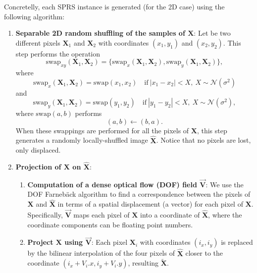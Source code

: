 \documentclass{article}
\begin{document}
Concretelly, each SPRS instance is generated (for the 2D case) using
the following algorithm:
\begin{enumerate}
\item \textbf{Separable 2D random shuffling of the samples of
    $\mathbf{X}$}: Let be two different pixels $\mathbf{X}_1$ and
  $\mathbf{X}_2$ with coordinates $(x_1, y_1)$ and $(x_2, y_2)$. This
  step performs the operation
  \begin{equation}
    \text{swap}_{xy}(\mathbf{X}_1,\mathbf{X}_2) = \{\text{swap}_x(\mathbf{X}_1,\mathbf{X}_2), \text{swap}_y(\mathbf{X}_1,\mathbf{X}_2)\},
  \end{equation}
  where
  \begin{equation}
    \text{swap}_x(\mathbf{X}_1,\mathbf{X}_2) = \text{swap}(x_1, x_2)\quad\text{if}~|x_1-x_2|<X,~X\sim\mathcal{N}(\sigma^2)
  \end{equation}
  and
  \begin{equation}
    \text{swap}_y(\mathbf{X}_1,\mathbf{X}_2) = \text{swap}(y_1, y_2)\quad\text{if}~|y_1-y_2|<X,~X\sim\mathcal{N}(\sigma^2),
  \end{equation}
  where $\text{swap}(a,b)$ performs
  \begin{equation}
    (a,b) \leftarrow (b,a).
  \end{equation}
  When these swappings are performed for all the pixels of
  $\mathbf{X}$, this step generates a randomly locally-shuffled image
  $\hat{\mathbf{X}}$. Notice that no pixels are lost, only displaced.

\item \textbf{Projection of $\mathbf{X}$ on $\hat{\mathbf{X}}$}:
  \begin{enumerate}
  \item \textbf{Computation of a dense optical flow (DOF) field
      $\overrightarrow{\mathbf{V}}$}: We use the DOF Farneb\"ack
    algorithm \cite{farneback2003two} to find a correspondence between
    the pixels of $\mathbf{X}$ and $\hat{\mathbf{X}}$ in terms of a
    spatial displacement (a vector) for each pixel of
    $\mathbf{X}$. Specifically, $\overrightarrow{\mathbf{V}}$ maps each
    pixel of $\mathbf{X}$ into a coordinate of $\hat{\mathbf{X}}$,
    where the coordinate components can be floating point numbers.
  \item \textbf{Project $\mathbf{X}$ using
      $\overrightarrow{\mathbf{V}}$}: Each pixel $\mathbf{X}_i$
    with coordinates $(i_x, i_y)$ is replaced by the bilinear
    interpolation of the four pixels of $\hat{\mathbf{X}}$ closer to
    the coordinate $(i_x+V_i.x,i_y+V_i.y)$, resulting
    $\tilde{\mathbf{X}}$.
  \end{enumerate}
\end{enumerate}
\end{document}
